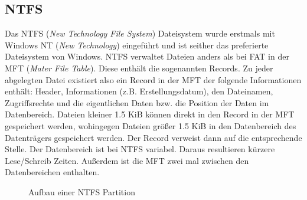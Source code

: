 \documentclass[12pt,a4paper]{article}
\begin{document}
\subsection{NTFS}
    Das NTFS (\textit{New Technology File System}) Dateisystem wurde erstmals mit Windows NT (\textit{New Technology}) eingeführt und ist seither das preferierte Dateisystem von Windows. NTFS verwaltet Dateien anders als bei FAT in der MFT (\textit{Mater File Table}). Diese enthält die sogenannten Records. Zu jeder abgelegten Datei existiert also ein Record in der MFT der folgende Informationen enthält: Header, Informationen (z.B. Erstellungsdatum), den Dateinamen, Zugriffsrechte und die eigentlichen Daten bzw. die Position der Daten im Datenbereich. Dateien kleiner 1.5 KiB können direkt in den Record in der MFT gespeichert werden, wohingegen Dateien größer 1.5 KiB in den Datenbereich des Datenträgers gespeichert werden. Der Record verweist dann auf die entsprechende Stelle. Der Datenbereich ist bei NTFS variabel. Daraus resultieren kürzere Lese/Schreib Zeiten. Außerdem ist die MFT zwei mal zwischen den Datenbereichen enthalten.
    \begin{figure}[h]
        \centering
        \caption{Aufbau einer NTFS Partition}
	\end{figure}
\end{document}
